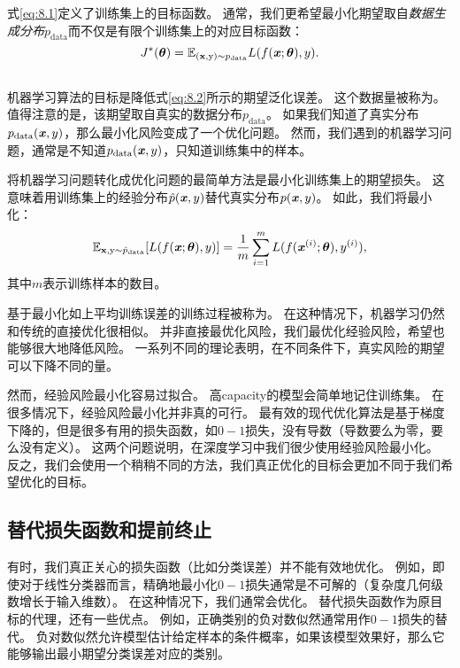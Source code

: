 式\ref{eq:8.1}定义了训练集上的目标函数。
通常，我们更希望最小化期望取自\emph{数据生成分布}$p_{\text{data}}$而不仅是有限个训练集上的对应目标函数：
\begin{equation}
\label{eq:8.2}
    J^*(\boldsymbol{\theta}) = \mathbb{E}_{(\mathbf{x}, \mathrm{y}) \sim p_\text{data}} L(f(\boldsymbol{\mathit{x}};\boldsymbol{\theta}),y).
\end{equation}

\subsection{}
\label{sec:empirical_risk_minimization}
机器学习算法的目标是降低式\ref{eq:8.2}所示的期望泛化误差。
这个数据量被称为。
值得注意的是，该期望取自真实的数据分布$p_\text{data}$。
如果我们知道了真实分布$p_\text{data}(\boldsymbol{\mathit{x}}, y)$，那么最小化风险变成了一个优化问题。
然而，我们遇到的机器学习问题，通常是不知道$p_\text{data}(\boldsymbol{\mathit{x}}, y)$，只知道训练集中的样本。


将机器学习问题转化成优化问题的最简单方法是最小化训练集上的期望损失。
这意味着用训练集上的经验分布$\hat{p}(\boldsymbol{\mathit{x}},y)$替代真实分布$p(\boldsymbol{\mathit{x}},y)$。
如此，我们将最小化：
\begin{equation}
\label{eq:8.3}
    \mathbb{E}_{\mathbf{x}, \mathrm{y} \sim \hat{p}_\text{data}} [L(f(\boldsymbol{\mathit{x}}; \boldsymbol{\theta}), y)]
    = \frac{1}{m} \sum_{i=1}^m L( f(\boldsymbol{\mathit{x}}^{(i)}; \boldsymbol{\theta}), y^{(i)}) ,
\end{equation}
其中$m$表示训练样本的数目。

基于最小化如上平均训练误差的训练过程被称为。
在这种情况下，机器学习仍然和传统的直接优化很相似。
并非直接最优化风险，我们最优化经验风险，希望也能够很大地降低风险。
一系列不同的理论表明，在不同条件下，真实风险的期望可以下降不同的量。

然而，经验风险最小化容易过拟合。
高\gls{capacity}的模型会简单地记住训练集。
在很多情况下，经验风险最小化并非真的可行。
最有效的现代优化算法是基于梯度下降的，但是很多有用的损失函数，如$0-1$损失，没有导数（导数要么为零，要么没有定义）。
这两个问题说明，在深度学习中我们很少使用经验风险最小化。
反之，我们会使用一个稍稍不同的方法，我们真正优化的目标会更加不同于我们希望优化的目标。

\subsection{替代损失函数和提前终止}
\label{sec:surrogate_loss_functions_and_early_stopping}
有时，我们真正关心的损失函数（比如分类误差）并不能有效地优化。
例如，即使对于线性分类器而言，精确地最小化$0-1$损失通常是不可解的（复杂度几何级数增长于输入维数）\citep{Marcotte-92}。
在这种情况下，我们通常会优化。
替代损失函数作为原目标的代理，还有一些优点。  
例如，正确类别的负对数似然通常用作$0-1$损失的替代。
负对数似然允许模型估计给定样本的条件概率，如果该模型效果好，那么它能够输出最小期望分类误差对应的类别。

